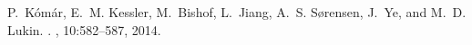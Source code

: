 \begin{thebibliography}{1}
P.~K\'{o}m\'{a}r, 
E.~M. Kessler, 
M.~Bishof, 
L.~Jiang, 
A.~S. S{\o}rensen, 
J.~Ye,
and M.~D. Lukin.
.
, 
10:582--587, 2014.




\end{thebibliography}
